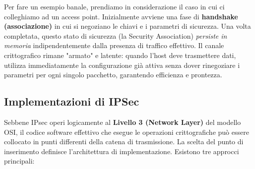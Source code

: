 \documentclass[a4paper, 11pt]{article}
\begin{document}
Per fare un esempio banale, prendiamo in considerazione il caso in cui ci colleghiamo ad un access point. Inizialmente avviene una fase di \textbf{handshake (associazione)} in cui si negoziano le chiavi e i parametri di sicurezza. Una volta completata, questo stato di sicurezza (la Security Association) \textit{persiste in memoria} indipendentemente dalla presenza di traffico effettivo. Il canale crittografico rimane "armato" e latente: quando l'host deve trasmettere dati, utilizza immediatamente la configurazione già attiva senza dover rinegoziare i parametri per ogni singolo pacchetto, garantendo efficienza e prontezza.

\subsection{Implementazioni di IPSec}

Sebbene IPsec operi logicamente al \textbf{Livello 3 (Network Layer)} del modello OSI, il codice software effettivo che esegue le operazioni crittografiche può essere collocato in punti differenti della catena di trasmissione. La scelta del punto di inserimento definisce l'architettura di implementazione. Esistono tre approcci principali:
\end{document}
